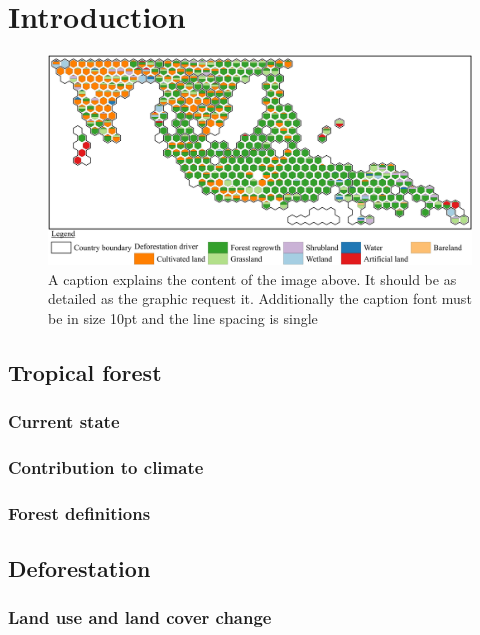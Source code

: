 \section{Introduction}
\label{sec:introduction}

\begin{figure}
	\centering
	\includegraphics[scale=.99]{img/driver_asia}
	\caption[list titel]{A caption explains the content of the image above. It should be as detailed as the graphic request it. Additionally the caption font must be in size 10pt and the line spacing is single}
	\label{fig:test}
\end{figure}

\lipsum[1-8]

\subsection{Tropical forest}
\subsubsection{Current state}
\subsubsection{Contribution to climate}
\subsubsection{Forest definitions}
\subsection{Deforestation}
\subsubsection{Land use and land cover change}
